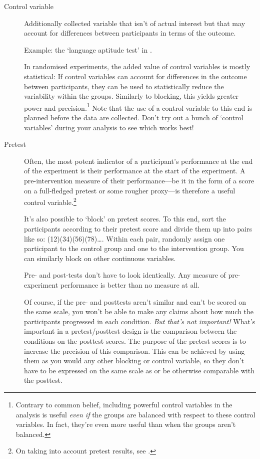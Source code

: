 \documentclass[a4paper]{tufte-book}\usepackage[]{graphicx}\usepackage[]{xcolor}
\begin{document}
\begin{description}
 \item[Control variable]  Additionally collected variable that isn't of actual interest
 but that may account for differences between participants in terms of the outcome.

 Example: the `language aptitude test' in \citet{Ludke2014}.

 In randomised experiments, the added value of control variables is mostly statistical:
 If control variables can account for differences in the outcome between participants,
 they can be used to statistically reduce the variability within the groups.
 Similarly to blocking, this yields greater power and precision.\footnote{Contrary to common belief, including powerful control variables in the analysis is useful \emph{even if} the groups are balanced with respect to these control variables. In fact, they're even more useful than when the groups aren't balanced.}
 Note that the use of a control variable to this end is planned before the data are
 collected. Don't try out a bunch of `control variables' during your analysis
 to see which works best!

 \item[Pretest] Often, the most potent indicator of a participant's performance
 at the end of the experiment is their performance at the start of the experiment.
 A pre-intervention measure of their performance---be it in the form of a score
 on a full-fledged pretest or some rougher proxy---is therefore a useful control variable.\footnote{On taking into account pretest results, see \citet{Vanhove2015}.}

 It's also possible to `block' on pretest scores. To this end, sort the participants
 according to their pretest score and divide them up into pairs like so:
 (12)(34)(56)(78)\dots. Within each pair, randomly assign one participant to the
 control group and one to the intervention group.
 You can similarly block on other continuous variables.

  \begin{framed}
 Pre- and post-tests don't have to look identically.
 Any measure of pre-experiment performance is better than no measure at all.
 \end{framed}

 Of course, if the pre- and posttests aren't similar and can't be scored
 on the same scale, you won't be able to make any claims about how much
 the participants progressed in each condition.
 \emph{But that's not important!}
 What's important in a pretest/posttest design is the comparison between
 the conditions on the posttest scores. The purpose of the pretest scores
 is to increase the precision of this comparison. This can be achieved
 by using them as you would any other blocking or control variable,
 so they don't have to be expressed on the same scale as
 or be otherwise comparable with the posttest.
\end{description}
\end{document}
